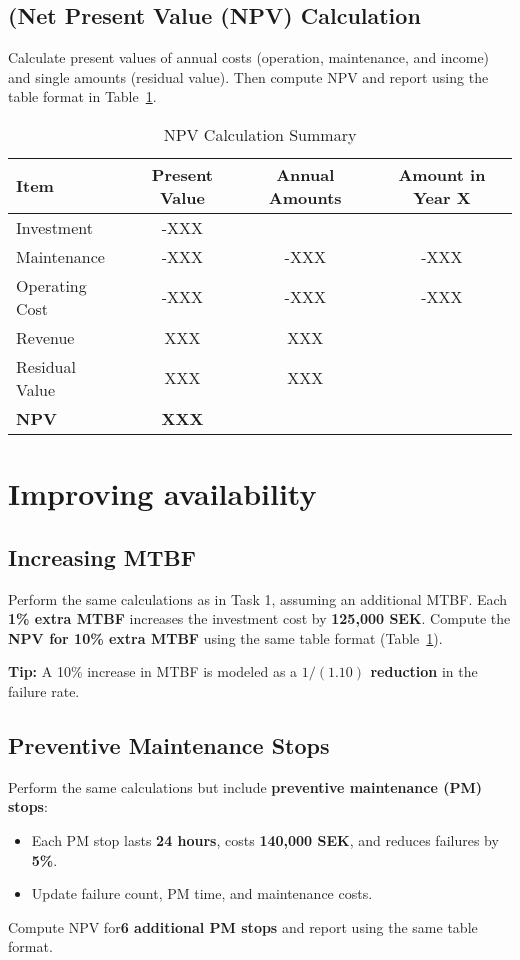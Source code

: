 \documentclass[a4paper,12pt]{exam}
\begin{document}
\subsection{(Net Present Value (NPV) Calculation}
Calculate present values of annual costs (operation, maintenance, and income) and single amounts (residual value). Then compute NPV and report using the table format in Table~\ref{NPVtable}.

\begin{table}[h]
    \centering
    \begin{tabular}{lccc}
        \toprule
        \textbf{Item} & \textbf{Present Value} & \textbf{Annual Amounts} & \textbf{Amount in Year X} \\
        \midrule
        Investment & -XXX &  &  \\
        Maintenance & -XXX & -XXX & -XXX \\
        Operating Cost & -XXX & -XXX & -XXX \\
        Revenue & XXX & XXX &  \\
        Residual Value & XXX & XXX &  \\
        \textbf{NPV} & \textbf{XXX} &  &  \\
        \bottomrule
    \end{tabular}
    \caption{NPV Calculation Summary}
    \label{NPVtable}
\end{table}

\section{Improving availability}
\subsection{Increasing MTBF}
Perform the same calculations as in Task 1, assuming an additional MTBF. Each \textbf{1\% extra MTBF} increases the investment cost by \textbf{125,000 SEK}. Compute the \textbf{NPV for 10\% extra MTBF} using the same table format (Table~\ref{NPVtable}).

\textbf{Tip:} A 10\% increase in MTBF is modeled as a \textbf{$1/(1.10)$ reduction} in the failure rate.

\subsection{Preventive Maintenance Stops}
Perform the same calculations but include \textbf{preventive maintenance (PM) stops}:
\begin{itemize}
    \item Each PM stop lasts \textbf{24 hours}, costs \textbf{140,000 SEK}, and reduces failures by \textbf{5\%}.
    \item Update failure count, PM time, and maintenance costs.
\end{itemize}
Compute NPV for\textbf{6 additional PM stops} and report using the same table format.
\end{document}
